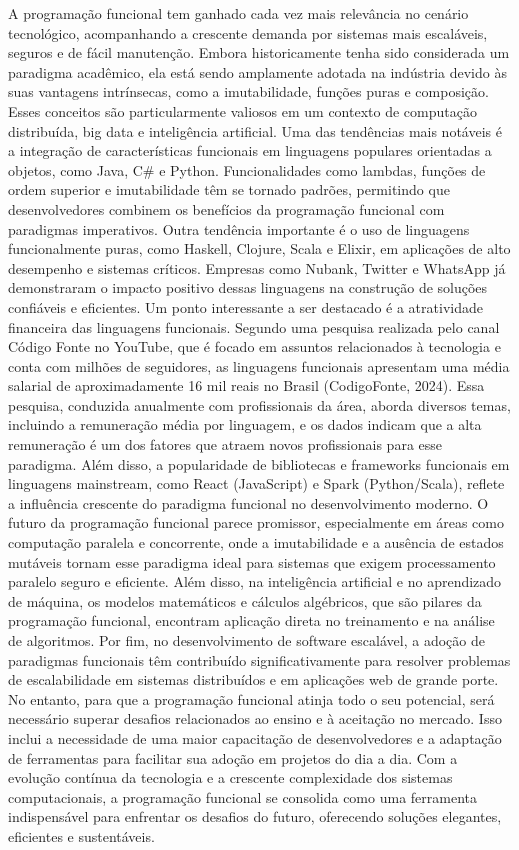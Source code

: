 A programação funcional tem ganhado cada vez mais relevância no cenário tecnológico, acompanhando a crescente demanda por sistemas mais escaláveis, seguros e de fácil manutenção. Embora historicamente tenha sido considerada um paradigma acadêmico, ela está sendo amplamente adotada na indústria devido às suas vantagens intrínsecas, como a imutabilidade, funções puras e composição. Esses conceitos são particularmente valiosos em um contexto de computação distribuída, big data e inteligência artificial.
Uma das tendências mais notáveis é a integração de características funcionais em linguagens populares orientadas a objetos, como Java, C# e Python. Funcionalidades como lambdas, funções de ordem superior e imutabilidade têm se tornado padrões, permitindo que desenvolvedores combinem os benefícios da programação funcional com paradigmas imperativos.
Outra tendência importante é o uso de linguagens funcionalmente puras, como Haskell, Clojure, Scala e Elixir, em aplicações de alto desempenho e sistemas críticos. Empresas como Nubank, Twitter e WhatsApp já demonstraram o impacto positivo dessas linguagens na construção de soluções confiáveis e eficientes. Um ponto interessante a ser destacado é a atratividade financeira das linguagens funcionais. Segundo uma pesquisa realizada pelo canal Código Fonte no YouTube, que é focado em assuntos relacionados à tecnologia e conta com milhões de seguidores, as linguagens funcionais apresentam uma média salarial de aproximadamente 16 mil reais no Brasil (CodigoFonte, 2024). Essa pesquisa, conduzida anualmente com profissionais da área, aborda diversos temas, incluindo a remuneração média por linguagem, e os dados indicam que a alta remuneração é um dos fatores que atraem novos profissionais para esse paradigma. Além disso, a popularidade de bibliotecas e frameworks funcionais em linguagens mainstream, como React (JavaScript) e Spark (Python/Scala), reflete a influência crescente do paradigma funcional no desenvolvimento moderno. O futuro da programação funcional parece promissor, especialmente em áreas como computação paralela e concorrente, onde a imutabilidade e a ausência de estados mutáveis tornam esse paradigma ideal para sistemas que exigem processamento paralelo seguro e eficiente. Além disso, na inteligência artificial e no aprendizado de máquina, os modelos matemáticos e cálculos algébricos, que são pilares da programação funcional, encontram aplicação direta no treinamento e na análise de algoritmos. Por fim, no desenvolvimento de software escalável, a adoção de paradigmas funcionais têm contribuído significativamente para resolver problemas de escalabilidade em sistemas distribuídos e em aplicações web de grande porte.
No entanto, para que a programação funcional atinja todo o seu potencial, será necessário superar desafios relacionados ao ensino e à aceitação no mercado. Isso inclui a necessidade de uma maior capacitação de desenvolvedores e a adaptação de ferramentas para facilitar sua adoção em projetos do dia a dia.
Com a evolução contínua da tecnologia e a crescente complexidade dos sistemas computacionais, a programação funcional se consolida como uma ferramenta indispensável para enfrentar os desafios do futuro, oferecendo soluções elegantes, eficientes e sustentáveis.

